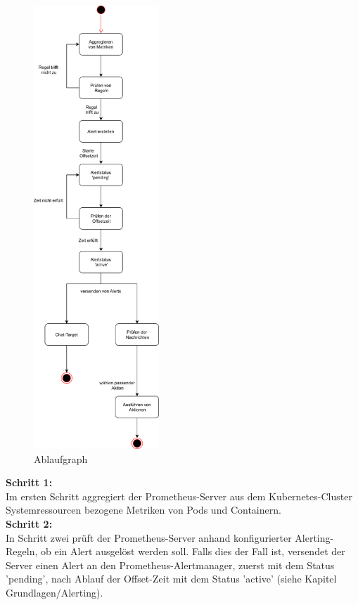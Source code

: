 \documentclass[a4paper,10pt]{scrartcl}
\begin{document}
\pagebreak

\begin{figure}

\begin{center}
  \includegraphics[width=0.42\textwidth,height=1.32\textwidth]{img/AAMtextless.PNG}
  \caption{Ablaufgraph}
\end{center}

\end{figure}
\textbf{Schritt 1:}\\
Im ersten Schritt aggregiert der Prometheus-Server
aus dem Kubernetes-Cluster Systemressourcen bezogene Metriken
von Pods und Containern.\\

\textbf{Schritt 2:}\\
In Schritt zwei prüft der Prometheus-Server anhand konfigurierter Alerting-Regeln,
ob ein Alert ausgelöst werden soll. Falls dies der Fall ist,
versendet der Server einen Alert an den Prometheus-Alertmanager,
 zuerst mit dem Status 'pending',
nach Ablauf der Offset-Zeit mit dem Status 'active' (siehe Kapitel Grundlagen/Alerting).
\end{document}
